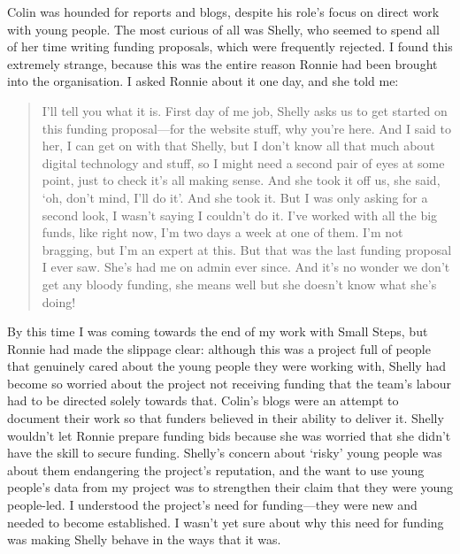 Colin was hounded for reports and blogs, despite his role's focus on direct work with young people. The most curious of all was Shelly, who seemed to spend all of her time writing funding proposals, which were frequently rejected. I found this extremely strange, because this was the entire reason Ronnie had been brought into the organisation. I asked Ronnie about it one day, and she told me:
\begin{quote}
I'll tell you what it is. First day of me job, Shelly asks us to get started on this funding proposal—for the website stuff, why you're here. And I said to her, I can get on with that Shelly, but I don't know all that much about digital technology and stuff, so I might need a second pair of eyes at some point, just to check it's all making sense. And she took it off us, she said, `oh, don't mind, I'll do it'. And she took it. But I was only asking for a second look, I wasn't saying I couldn't do it. I've worked with all the big funds, like right now, I'm two days a week at one of them. I'm not bragging, but I'm an expert at this. But that was the last funding proposal I ever saw. She's had me on admin ever since. And it's no wonder we don't get any bloody funding, she means well but she doesn't know what she's doing!
\end{quote}

By this time I was coming towards the end of my work with Small Steps, but Ronnie had made the slippage clear: although this was a project full of people that genuinely cared about the young people they were working with, Shelly had become so worried about the project not receiving funding that the team's labour had to be directed solely towards that. Colin's blogs were an attempt to document their work so that funders believed in their ability to deliver it. Shelly wouldn't let Ronnie prepare funding bids because she was worried that she didn't have the skill to secure funding. Shelly's concern about `risky' young people was about them endangering the project's reputation, and the want to use young people's data from my project was to strengthen their claim that they were young people-led. I understood the project's need for funding—they were new and needed to become established. I wasn't yet sure about why this need for funding was making Shelly behave in the ways that it was.


